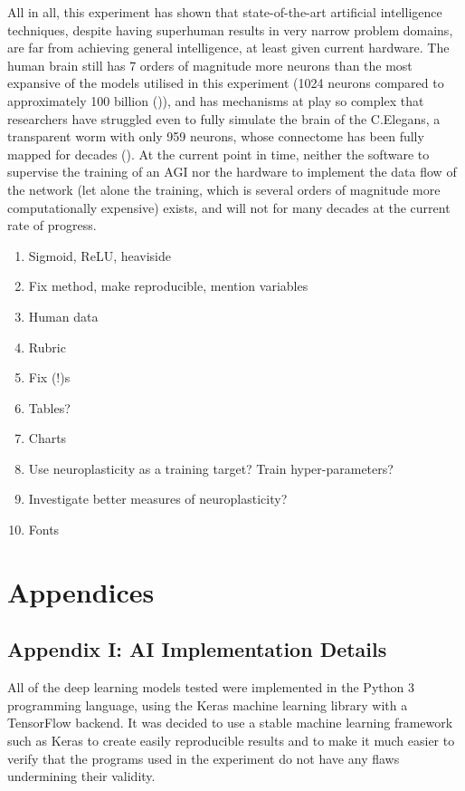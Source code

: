 \documentclass[]{report}
\begin{document}
All in all, this experiment has shown that state-of-the-art artificial intelligence techniques, despite having superhuman results in very narrow problem domains, are far from achieving general intelligence, at least given current hardware. The human brain still has 7 orders of magnitude more neurons than the most expansive of the models utilised in this experiment (1024 neurons compared to approximately 100 billion (\cite{herculano2009human})), and has mechanisms at play so complex that researchers have struggled even to fully simulate the brain of the C.Elegans, a transparent worm with only 959 neurons, whose connectome has been fully mapped for decades (\cite{wormwiring2012}). At the current point in time, neither the software to supervise the training of an AGI nor the hardware to implement the data flow of the network (let alone the training, which is several orders of magnitude more computationally expensive) exists, and will not for many decades at the current rate of progress.

\begin{enumerate}
	\item Sigmoid, ReLU, heaviside
	\item Fix method, make reproducible, mention variables
	\item Human data
	\item Rubric
	\item Fix (!)s
	\item Tables?
	\item Charts
	\item Use neuroplasticity as a training target? Train hyper-parameters?
	\item Investigate better measures of neuroplasticity?
	\item Fonts
\end{enumerate}

\section{Appendices}

\label{sec:Appendix_I}
\subsection{Appendix I: AI Implementation Details}

All of the deep learning models tested were implemented in the Python 3 programming language, using the Keras machine learning library with a TensorFlow backend. It was decided to use a stable machine learning framework such as Keras to create easily reproducible results and to make it much easier to verify that the programs used in the experiment do not have any flaws undermining their validity.
\end{document}
